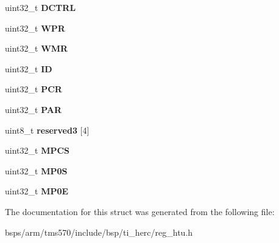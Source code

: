 \begin{DoxyCompactItemize}
uint32\+\_\+t {\bfseries D\+C\+T\+RL}
\item 
\mbox{\label{structtms570__htu__t_aefe45019a5de7f97493e5cc85b5f4f8d}} 
uint32\+\_\+t {\bfseries W\+PR}
\item 
\mbox{\label{structtms570__htu__t_ac241ef5b9a7c578df9bcb82b423ff7cb}} 
uint32\+\_\+t {\bfseries W\+MR}
\item 
\mbox{\label{structtms570__htu__t_af9d67565c3b1025e59a90e963e3a854f}} 
uint32\+\_\+t {\bfseries ID}
\item 
\mbox{\label{structtms570__htu__t_a7a344184c65fcbfab69be67e221d2586}} 
uint32\+\_\+t {\bfseries P\+CR}
\item 
\mbox{\label{structtms570__htu__t_a3d786977d141430f2230f3c97270d00f}} 
uint32\+\_\+t {\bfseries P\+AR}
\item 
\mbox{\label{structtms570__htu__t_aa8b204f1a3d820543095171d452dec6f}} 
uint8\+\_\+t {\bfseries reserved3} \mbox{[}4\mbox{]}
\item 
\mbox{\label{structtms570__htu__t_a7b8620dc6267f1c5b148ae9e90252e26}} 
uint32\+\_\+t {\bfseries M\+P\+CS}
\item 
\mbox{\label{structtms570__htu__t_a41985cf93f110a8b62370ab7db313baa}} 
uint32\+\_\+t {\bfseries M\+P0S}
\item 
\mbox{\label{structtms570__htu__t_ae78e10135677bc58ee44cfbb365a746e}} 
uint32\+\_\+t {\bfseries M\+P0E}
\end{DoxyCompactItemize}


The documentation for this struct was generated from the following file\+:\begin{DoxyCompactItemize}
\item 
bsps/arm/tms570/include/bsp/ti\+\_\+herc/reg\+\_\+htu.\+h\end{DoxyCompactItemize}
